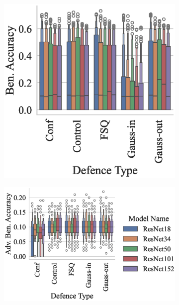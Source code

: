 \begin{figure}
\begin{subfigure}[]{0.27\textwidth}
    \centering
    \includegraphics[width=\textwidth]{cifar/ben_accuracy_vs_defence_type.eps}
\end{subfigure}
\begin{subfigure}[]{0.27\textwidth}
    \centering
    \includegraphics[width=\textwidth]{cifar/adv_accuracy_vs_defence_type.eps}
\end{subfigure}
\begin{subfigure}[]{0.36\textwidth}

\end{subfigure}
\end{figure}
